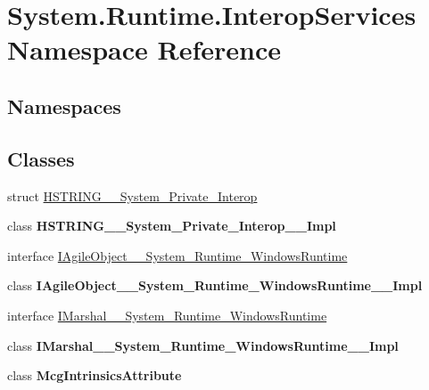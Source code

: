 \hypertarget{namespace_system_1_1_runtime_1_1_interop_services}{}\section{System.\+Runtime.\+Interop\+Services Namespace Reference}
\label{namespace_system_1_1_runtime_1_1_interop_services}
\subsection*{Namespaces}
\begin{DoxyCompactItemize}
\end{DoxyCompactItemize}
\subsection*{Classes}
\begin{DoxyCompactItemize}
\item 
struct \hyperlink{struct_system_1_1_runtime_1_1_interop_services_1_1_h_s_t_r_i_n_g_____system___private___interop}{H\+S\+T\+R\+I\+N\+G\+\_\+\+\_\+\+System\+\_\+\+Private\+\_\+\+Interop}
\item 
class {\bfseries H\+S\+T\+R\+I\+N\+G\+\_\+\+\_\+\+System\+\_\+\+Private\+\_\+\+Interop\+\_\+\+\_\+\+Impl}
\item 
interface \hyperlink{interface_system_1_1_runtime_1_1_interop_services_1_1_i_agile_object_____system___runtime___windows_runtime}{I\+Agile\+Object\+\_\+\+\_\+\+System\+\_\+\+Runtime\+\_\+\+Windows\+Runtime}
\item 
class {\bfseries I\+Agile\+Object\+\_\+\+\_\+\+System\+\_\+\+Runtime\+\_\+\+Windows\+Runtime\+\_\+\+\_\+\+Impl}
\item 
interface \hyperlink{interface_system_1_1_runtime_1_1_interop_services_1_1_i_marshal_____system___runtime___windows_runtime}{I\+Marshal\+\_\+\+\_\+\+System\+\_\+\+Runtime\+\_\+\+Windows\+Runtime}
\item 
class {\bfseries I\+Marshal\+\_\+\+\_\+\+System\+\_\+\+Runtime\+\_\+\+Windows\+Runtime\+\_\+\+\_\+\+Impl}
\item 
class {\bfseries Mcg\+Intrinsics\+Attribute}
\end{DoxyCompactItemize}
